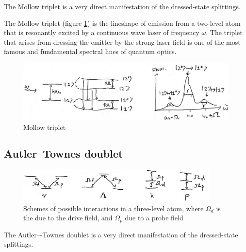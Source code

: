 The Mollow triplet is a very direct manifestation of the dressed-state splittings.

The Mollow triplet (figure \ref{fig:mollow-triplet}) is the lineshape of emission from a two-level atom that is resonantly excited by a continuous wave laser of frequency $\omega$. The triplet that arises from dressing the emitter by the strong laser field is one of the most famous and fundamental spectral lines of quantum optics.
\begin{figure}[H]
	\centering
	\includegraphics[width=\textwidth]{./images/3-mollow-triplet}
	\caption{Mollow triplet}
	\label{fig:mollow-triplet}
\end{figure}

\subsection{Autler--Townes doublet}
\begin{figure}[H]
	\centering
	\includegraphics[width=0.9\textwidth]{./images/3-three-level-schemes1}
	\caption{Schemes of possible interactions in a three-level atom, where $\Omega_{d}$ is the due to the drive field, and $\Omega_{p}$ due to a probe field}
	\label{fig:three-level-schemes1}
\end{figure}

The Autler–-Townes doublet is a very direct manifestation of the dressed-state splittings.

